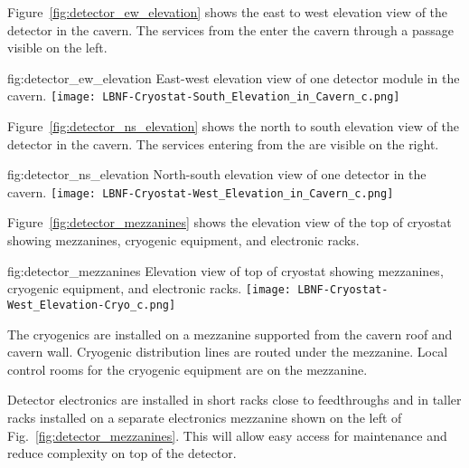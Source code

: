 Figure~\ref{fig:detector_ew_elevation} shows the east to west elevation view of the
detector in the cavern. The services from the
 enter the cavern through a passage visible on the left.
\begin{dunefigure}{fig:detector_ew_elevation}
  {East-west elevation view of one detector module in the cavern.}
  \texttt{[image: LBNF-Cryostat-South\_Elevation\_in\_Cavern\_c.png]}
\end{dunefigure}

Figure~\ref{fig:detector_ns_elevation} shows the north to south elevation view of the
detector in the cavern. The services entering
from the  are visible on the right.
\begin{dunefigure}{fig:detector_ns_elevation}
  {North-south elevation view of one detector in the cavern.}
  \texttt{[image: LBNF-Cryostat-West\_Elevation\_in\_Cavern\_c.png]}
\end{dunefigure}

Figure~\ref{fig:detector_mezzanines} shows the elevation view of the
top of cryostat showing mezzanines, cryogenic equipment, and electronic
racks.
\begin{dunefigure}{fig:detector_mezzanines}
  {Elevation view of top of cryostat showing mezzanines, cryogenic
    equipment, and electronic racks.}
  \texttt{[image: LBNF-Cryostat-West\_Elevation-Cryo\_c.png]}
\end{dunefigure}
The cryogenics are installed on a mezzanine supported from
the cavern roof and cavern wall. Cryogenic distribution lines are
routed under the mezzanine. Local control rooms for the
cryogenic equipment are on the mezzanine.

Detector electronics are installed in short racks close to
feedthroughs and in taller racks installed on a separate electronics
mezzanine shown on the left of Fig.~\ref{fig:detector_mezzanines}.
This will allow easy access for maintenance and reduce complexity on
top of the detector.
